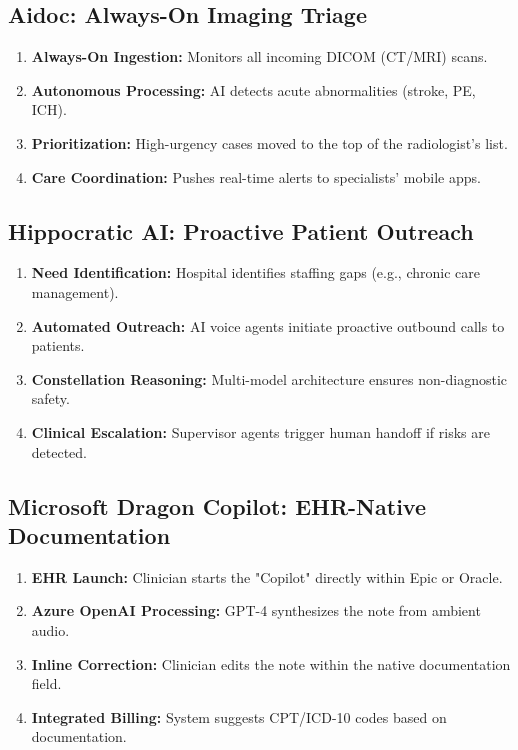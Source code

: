 \documentclass[12pt,a4paper]{article}
\begin{document}
\subsection{Aidoc: Always-On Imaging Triage}
\begin{enumerate}[noitemsep]
    \item \textbf{Always-On Ingestion:} Monitors all incoming DICOM (CT/MRI) scans.
    \item \textbf{Autonomous Processing:} AI detects acute abnormalities (stroke, PE, ICH).
    \item \textbf{Prioritization:} High-urgency cases moved to the top of the radiologist's list.
    \item \textbf{Care Coordination:} Pushes real-time alerts to specialists' mobile apps.
\end{enumerate}

\subsection{Hippocratic AI: Proactive Patient Outreach}
\begin{enumerate}[noitemsep]
    \item \textbf{Need Identification:} Hospital identifies staffing gaps (e.g., chronic care management).
    \item \textbf{Automated Outreach:} AI voice agents initiate proactive outbound calls to patients.
    \item \textbf{Constellation Reasoning:} Multi-model architecture ensures non-diagnostic safety.
    \item \textbf{Clinical Escalation:} Supervisor agents trigger human handoff if risks are detected.
\end{enumerate}

\subsection{Microsoft Dragon Copilot: EHR-Native Documentation}
\begin{enumerate}[noitemsep]
    \item \textbf{EHR Launch:} Clinician starts the "Copilot" directly within Epic or Oracle.
    \item \textbf{Azure OpenAI Processing:} GPT-4 synthesizes the note from ambient audio.
    \item \textbf{Inline Correction:} Clinician edits the note within the native documentation field.
    \item \textbf{Integrated Billing:} System suggests CPT/ICD-10 codes based on documentation.
\end{enumerate}
\end{document}
